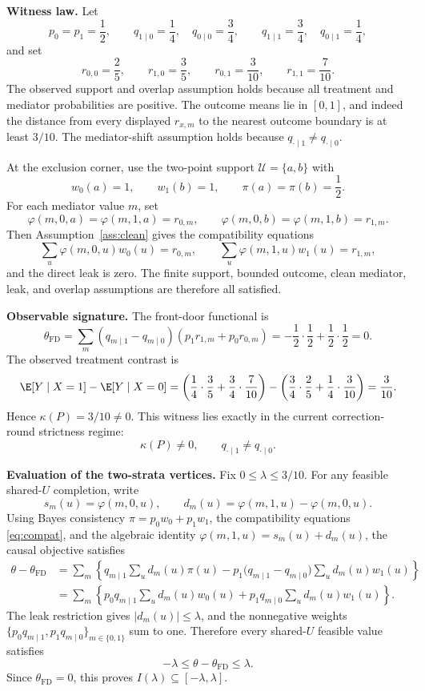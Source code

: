 \textbf{Witness law.} Let
\[
  p_0=p_1=\frac12,\qquad
  q_{1\mid0}=\frac14,\quad q_{0\mid0}=\frac34,\qquad
  q_{1\mid1}=\frac34,\quad q_{0\mid1}=\frac14,
\]
and set
\[
  r_{0,0}=\frac25,\qquad r_{1,0}=\frac35,\qquad
  r_{0,1}=\frac3{10},\qquad r_{1,1}=\frac7{10}.
\]
The observed support and overlap assumption holds because all treatment and
mediator probabilities are positive. The outcome means lie in \([0,1]\), and
indeed the distance from every displayed \(r_{x,m}\) to the nearest outcome
boundary is at least \(3/10\). The mediator-shift assumption holds because
\(q_{\cdot\mid1}\neq q_{\cdot\mid0}\).

At the exclusion corner, use the two-point support \(\mathcal U=\{a,b\}\) with
\[
  w_0(a)=1,\qquad w_1(b)=1,\qquad \pi(a)=\pi(b)=\frac12.
\]
For each mediator value \(m\), set
\[
  \varphi(m,0,a)=\varphi(m,1,a)=r_{0,m},\qquad
  \varphi(m,0,b)=\varphi(m,1,b)=r_{1,m}.
\]
Then Assumption~\ref{ass:clean} gives the compatibility equations
\[
  \sum_u\varphi(m,0,u)w_0(u)=r_{0,m},\qquad
  \sum_u\varphi(m,1,u)w_1(u)=r_{1,m},
\]
and the direct leak is zero. The finite support, bounded outcome, clean mediator,
leak, and overlap assumptions are therefore all satisfied.

\textbf{Observable signature.} The front-door functional is
\[
  \theta_{\mathrm{FD}}
  =\sum_m(q_{m\mid1}-q_{m\mid0})(p_1r_{1,m}+p_0r_{0,m})
  =-\frac12\cdot\frac12+\frac12\cdot\frac12=0.
\]
The observed treatment contrast is
\[
  \E[Y\mid X=1]-\E[Y\mid X=0]
  =\left(\frac14\cdot\frac35+\frac34\cdot\frac7{10}\right)
   -\left(\frac34\cdot\frac25+\frac14\cdot\frac3{10}\right)
  =\frac3{10}.
\]
Hence \(\kappa(P)=3/10\neq0\). This witness lies exactly in the current
correction-round strictness regime:
\[
  \kappa(P)\neq0,\qquad q_{\cdot\mid1}\neq q_{\cdot\mid0}.
\]

\textbf{Evaluation of the two-strata vertices.} Fix \(0\le\lambda\le3/10\). For
any feasible shared-\(U\) completion, write
\[
  s_m(u)=\varphi(m,0,u),\qquad d_m(u)=\varphi(m,1,u)-\varphi(m,0,u).
\]
Using Bayes consistency \(\pi=p_0w_0+p_1w_1\), the compatibility equations
\eqref{eq:compat}, and the algebraic identity
\(\varphi(m,1,u)=s_m(u)+d_m(u)\), the causal objective satisfies
\[
\begin{aligned}
  \theta-\theta_{\mathrm{FD}}
  &=\sum_m\left\{q_{m\mid1}\sum_u d_m(u)\pi(u)
       -p_1\bigl(q_{m\mid1}-q_{m\mid0}\bigr)\sum_u d_m(u)w_1(u)\right\} \\
  &=\sum_m\left\{
       p_0q_{m\mid1}\sum_u d_m(u)w_0(u)
       +p_1q_{m\mid0}\sum_u d_m(u)w_1(u)\right\}.
\end{aligned}
\]
The leak restriction gives \(|d_m(u)|\le\lambda\), and the nonnegative weights
\(\{p_0q_{m\mid1},p_1q_{m\mid0}\}_{m\in\{0,1\}}\) sum to one. Therefore every
shared-\(U\) feasible value satisfies
\[
  -\lambda\le\theta-\theta_{\mathrm{FD}}\le\lambda.
\]
Since \(\theta_{\mathrm{FD}}=0\), this proves \(I(\lambda)\subseteq[-\lambda,\lambda]\).

